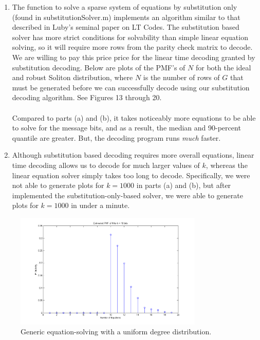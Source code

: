 \documentclass[11pt]{article}
\begin{document}
\begin{enumerate}
\begin{enumerate}
        \item The function to solve a sparse system of equations by substitution only (found in substitutionSolver.m) implements an algorithm similar to that described in Luby's seminal paper on LT Codes. The substitution based solver has more strict conditions for solvability than simple linear equation solving, so it will require more rows from the parity check matrix to decode. We are willing to pay this price price for the linear time decoding granted by substitution decoding. Below are plots of the PMF's of $N$ for both the ideal and robust Soliton distribution, where $N$ is the number of rows of $G$ that must be generated before we can successfully decode using our substitution decoding algorithm. See Figures 13 through 20. \\
            \\
            Compared to parts (a) and (b), it takes noticeably more equations to be able to solve for the message bits, and as a result, the median and 90-percent quantile are greater. But, the decoding program runs \emph{much} faster.




        \item Although substitution based decoding requires more overall equations, linear time decoding allows us to decode for much larger values of $k$, whereas the linear equation solver simply takes too long to decode. Specifically, we were not able to generate plots for $k = 1000$ in parts (a) and (b), but after implemented the substitution-only-based solver, we were able to generate plots for $k = 1000$ in under a minute.

            \newpage




    \end{enumerate}


    \begin{figure}[H]
        \begin{center}
            \includegraphics[width = 0.8\textwidth]{figure_1a_k10.png}
            \caption{Generic equation-solving with a uniform degree distribution.}
        \end{center}
    \end{figure}


\end{enumerate}
\end{document}

